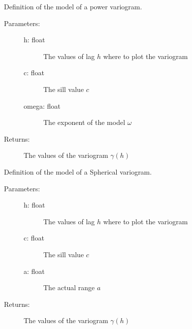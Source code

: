 \documentclass[letterpaper,10pt,english]{sphinxmanual}
\begin{document}

\begin{fulllineitems}
\label{\detokenize{appendices:s2Dcd.gslibnumpy.power}}
Definition of the model of a power variogram.
\begin{description}
\item[{Parameters:}] \leavevmode\begin{description}
\item[{h: float}] \leavevmode
The values of lag \(h\) where to plot the variogram

\item[{c: float}] \leavevmode
The sill value \(c\)

\item[{omega: float}] \leavevmode
The exponent of the model \(\omega\)

\end{description}

\item[{Returns:}] \leavevmode
The values of the variogram \(\gamma(h)\)

\end{description}

\end{fulllineitems}


\begin{fulllineitems}
\label{\detokenize{appendices:s2Dcd.gslibnumpy.spherical}}
Definition of the model of a Spherical variogram.
\begin{description}
\item[{Parameters:}] \leavevmode\begin{description}
\item[{h: float}] \leavevmode
The values of lag \(h\) where to plot the variogram

\item[{c: float}] \leavevmode
The sill value \(c\)

\item[{a: float}] \leavevmode
The actual range \(a\)

\end{description}

\item[{Returns:}] \leavevmode
The values of the variogram \(\gamma(h)\)

\end{description}

\end{fulllineitems}
\end{document}
